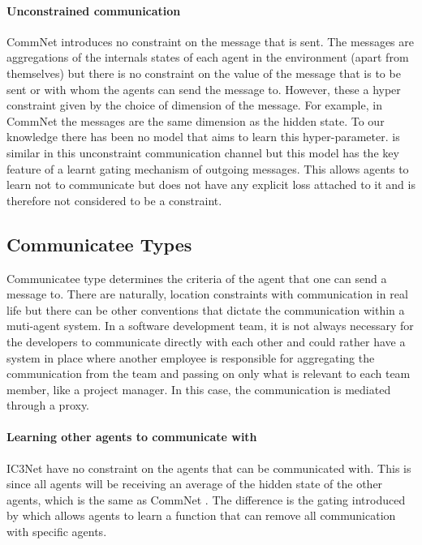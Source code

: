 \documentclass{article}
\begin{document}
\paragraph{Unconstrained communication}
CommNet \citep{sukhbaatar2016commnet} introduces no constraint on the message that is sent. The messages are aggregations of the internals states of each agent in the environment (apart from themselves) but there is no constraint on the value of the message that is to be sent or with whom the agents can send the message to. However, these a hyper constraint given by the choice of dimension of the message. For example, in CommNet the messages are the same dimension as the hidden state. To our knowledge there has been no model that aims to learn this hyper-parameter. \citet{singh2018ic3net} is similar in this unconstraint communication channel but this model has the key feature of a learnt gating mechanism of outgoing messages. This allows agents to learn not to communicate but does not have any explicit loss attached to it and is therefore not considered to be a constraint. 

\subsection{Communicatee Types}

Communicatee type determines the criteria of the agent that one can send a message to. There are naturally, location constraints with communication in real life but there can be other conventions that dictate the communication within a muti-agent system. In a software development team, it is not always necessary for the developers to communicate directly with each other and could rather have a system in place where another employee is responsible for aggregating the communication from the team and passing on only what is relevant to each team member, like a project manager. In this case, the communication is mediated through a proxy.

\paragraph{Learning other agents to communicate with} IC3Net \citep{singh2018ic3net} have no constraint on the agents that can be communicated with. This is since all agents will be receiving an average of the hidden state of the other agents, which is the same as CommNet \citep{sukhbaatar2016commnet}. The difference is the gating introduced by \citet{singh2018ic3net} which allows agents to learn a function that can remove all communication with specific agents.
\end{document}
